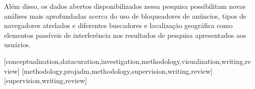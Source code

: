 \documentclass[portuguese]{textolivre}
\begin{document}
Além disso, os dados abertos disponibilizados nessa pesquisa possibilitam novas análises mais aprofundadas acerca do uso de bloqueadores de anúncios, tipos de navegadores atrelados e diferentes buscadores e localização geográfica como elementos passíveis de interferência nos resultados de pesquisa apresentados aos usuários.

\printbibliography\label{sec-bib}


\begin{contributors}
[conceptualization,datacuration,investigation,methodology,visualization,writing,review]
[methodology,projadm,methodology,supervision,writing,review]
[supervision,writing,review]
\end{contributors}
\end{document}
